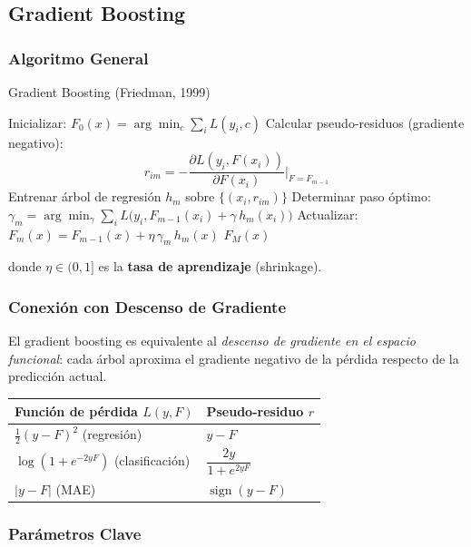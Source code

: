 \documentclass[12pt, a4paper]{article}
\DeclareMathOperator{\sign}{sign}
\begin{document}
\subsection{Gradient Boosting}

\subsubsection{Algoritmo General}

\begin{algbox}{Gradient Boosting (Friedman, 1999)}
\begin{algorithmic}[1]
  \State Inicializar: $F_0(x) = \arg\min_c \sum_i L(y_i, c)$
    \State Calcular pseudo-residuos (gradiente negativo):
    \[
      r_{im} = -\frac{\partial L(y_i, F(x_i))}{\partial F(x_i)}\bigg|_{F=F_{m-1}}
    \]
    \State Entrenar árbol de regresión $h_m$ sobre $\{(x_i, r_{im})\}$
    \State Determinar paso óptimo:
    $\gamma_m = \arg\min_\gamma \sum_i L\bigl(y_i, F_{m-1}(x_i) + \gamma\, h_m(x_i)\bigr)$
    \State Actualizar: $F_m(x) = F_{m-1}(x) + \eta\,\gamma_m\, h_m(x)$
  \EndFor
  \State \Return $F_M(x)$
\end{algorithmic}
\end{algbox}

donde $\eta \in (0,1]$ es la \textbf{tasa de aprendizaje} (shrinkage).

\subsubsection{Conexión con Descenso de Gradiente}

El gradient boosting es equivalente al \emph{descenso de gradiente en el espacio funcional}:
cada árbol aproxima el gradiente negativo de la pérdida respecto de la predicción actual.

\begin{center}
\begin{tabular}{ll}
\toprule
\textbf{Función de pérdida} $L(y, F)$ & \textbf{Pseudo-residuo} $r$ \\
\midrule
$\tfrac{1}{2}(y-F)^2$ (regresión) & $y - F$ \\
$\log(1+e^{-2yF})$ (clasificación) & $\dfrac{2y}{1+e^{2yF}}$ \\
$|y-F|$ (MAE) & $\sign(y-F)$ \\
\bottomrule
\end{tabular}
\end{center}

\subsubsection{Parámetros Clave}
\end{document}
